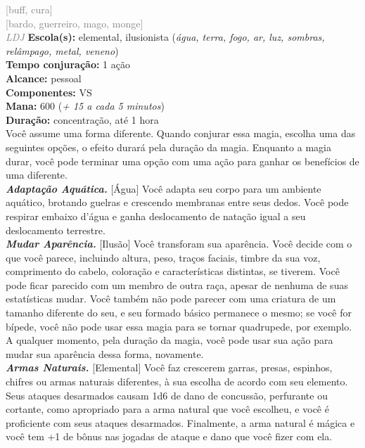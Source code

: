 \documentclass{RPG_Adventure}[2021/10/20]
\begin{document}
{\scriptsize \textcolor{gray}{[buff, cura]\\}}
{\scriptsize \textcolor{gray}{[bardo, guerreiro, mago, monge]\\}}
{\tiny \textcolor{gray}{\textit{LDJ}}}
{\small \t \textbf{Escola(s):} elemental, ilusionista (\textit{água, terra, fogo, ar, luz, sombras, relâmpago, metal, veneno})\\\t \textbf{Tempo conjuração:} 1 ação\\\t \textbf{Alcance:} pessoal\\\t \textbf{Componentes:} VS\\\t \textbf{Mana:} 600 (\textit{+ 15 a cada 5 minutos})\\\t \textbf{Duração:} concentração, até 1 hora\\}
{\normalsize Você assume uma forma diferente. Quando conjurar essa magia, escolha uma das seguintes opções, o efeito durará pela duração da magia. Enquanto a magia durar, você pode terminar uma opção com uma ação para ganhar os benefícios de uma diferente.\\\t \textbf{\textit{Adaptação Aquática.}} [Água] Você adapta seu corpo para um ambiente aquático, brotando guelras e crescendo membranas entre seus dedos. Você pode respirar embaixo d’água e ganha deslocamento de natação igual a seu deslocamento terrestre.\\\t \textbf{\textit{Mudar Aparência.}} [Ilusão] Você transforam sua aparência. Você decide com o que você parece, incluindo altura, peso, traços faciais, timbre da sua voz, comprimento do cabelo, coloração e características distintas, se tiverem. Você pode ficar parecido com um membro de outra raça, apesar de nenhuma de suas estatísticas mudar. Você também não pode parecer com uma criatura de um tamanho diferente do seu, e seu formado básico permanece o mesmo; se você for bípede, você não pode usar essa magia para se tornar quadrupede, por exemplo. A qualquer momento, pela duração da magia, você pode usar sua ação para mudar sua aparência dessa forma, novamente.\\\t \textbf{\textit{Armas Naturais.}} [Elemental] Você faz crescerem garras, presas, espinhos, chifres ou armas naturais diferentes, à sua escolha de acordo com seu elemento. Seus ataques desarmados causam 1d6 de dano de concussão, perfurante ou cortante, como apropriado para a arma natural que você escolheu, e você é proficiente com seus ataques desarmados. Finalmente, a arma natural é mágica e você tem +1 de bônus nas jogadas de ataque e dano que você fizer com ela.\\}
\end{document}
